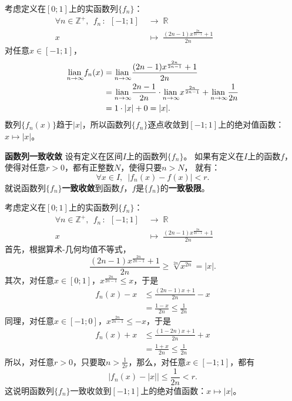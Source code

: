 \documentclass[12pt,UTF8]{ctexbook}
\begin{document}
\begin{ex}
    考虑定义在$[0;1]$上的实函数列$\{f_n\}$：
    \begin{align*}
        \forall n\in \mathbb{Z}^+, \;\, f_n \,: \,\; [-1;1]\; &\rightarrow \; \mathbb{R} \\
        x \;&\mapsto \; \frac{(2n-1)x^{\frac{2n}{2n-1}} + 1}{2n} \qquad\qquad\phantom{9} 
    \end{align*}
    对任意$x\in [-1;1]$，
    \begin{align*}
        \underset{n\to\infty}{\operatorname{lian}\,}f_n(x) &= \underset{n\to\infty}{\operatorname{lian}\,} \frac{(2n-1)x^{\frac{2n}{2n-1}} + 1}{2n} \\
        &= \underset{n\to\infty}{\operatorname{lian}\,} \frac{2n-1}{2n} \cdot\underset{n\to\infty}{\operatorname{lian}\,} x^{\frac{2n}{2n-1}} + \underset{n\to\infty}{\operatorname{lian}\,} \frac{1}{2n} \\
        &= 1 \cdot |x| + 0 = |x|. 
    \end{align*}
    数列$\{f_n(x)\}$趋于$|x|$，所以函数列$\{f_n\}$逐点收敛到$[-1;1]$上的绝对值函数：$x\mapsto |x|$。
\end{ex}

\begin{df}{\textbf{函数列一致收敛}}
    设有定义在区间$I$上的函数列$\{f_n\}$。
    如果有定义在$I$上的函数$f$，使得对任意$r>0$，都有正整数$N$，使得只要$n>N$，
    就有：
    $$ \forall x\in I, \,\,\,|f_n(x) - f(x) | < r.$$
    就说函数列$\{f_n\}$\textbf{一致收敛}到函数$f$，$f$是$\{f_n\}$的\textbf{一致极限}。
\end{df}

\begin{ex}
    考虑定义在$[0;1]$上的实函数列$\{f_n\}$：
    \begin{align*}
        \forall n\in \mathbb{Z}^+, \;\, f_n \,: \,\; [-1;1]\; &\rightarrow \; \mathbb{R} \\
        x \;&\mapsto \; \frac{(2n-1)x^{\frac{2n}{2n-1}} + 1}{2n} \qquad\qquad\phantom{9} 
    \end{align*}
    首先，根据算术-几何均值不等式，
    $$\frac{(2n-1)x^{\frac{2n}{2n-1}} + 1}{2n} \geqslant \sqrt[2n]{x^{2n}} = |x|.$$
    其次，对任意$x\in [0;1]$，$x^{\frac{2n}{2n-1}} \leqslant x$，于是
    \begin{align*}
        f_n(x) - x &\leqslant \frac{(2n-1)x + 1}{2n} - x \\
        &= \frac{1 - x}{2n} \leqslant \frac{1}{2n}
    \end{align*}
    同理，对任意$x\in [-1;0]$，$x^{\frac{2n}{2n-1}} \leqslant -x$，于是
    \begin{align*}
        f_n(x) + x &\leqslant \frac{(1 - 2n)x + 1}{2n} + x \\
        &= \frac{1 + x}{2n} \leqslant \frac{1}{2n}
    \end{align*}
    所以，对任意$r>0$，只要取$n> \frac{1}{2r}$，那么，对任意$x\in [-1;1]$，都有
    $$\Big|f_n(x) - |x|\Big| \leqslant \frac{1}{2n} < r. $$
    这说明函数列$\{f_n\}$一致收敛到$[-1;1]$上的绝对值函数：$x\mapsto |x|$。
\end{ex}
\end{document}
